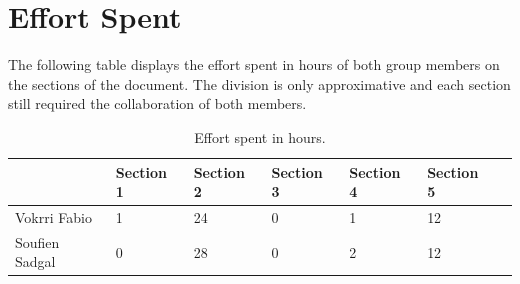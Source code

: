 \section{Effort Spent}
The following table displays the effort spent in hours of both group members on the sections of the document. The division is only approximative and each section still required the collaboration of both members.

\begin{table}[H]
    \centering
    \renewcommand{\arraystretch}{1.3}
    \begin{tabular}{|l|l|l|l|l|l|l|}
        \hline
        & \textbf{Section 1} & \textbf{Section 2} & \textbf{Section 3} &  \textbf{Section 4} & \textbf{Section 5}\\
        \hline
        Vokrri Fabio & 1 & 24 & 0 & 1 & 12\\
        \hline 
        Soufien Sadgal & 0 & 28 & 0 & 2 & 12\\
        \hline
    \end{tabular}
    \caption{Effort spent in hours.}
    \label{tab:effort_spent}
\end{table}